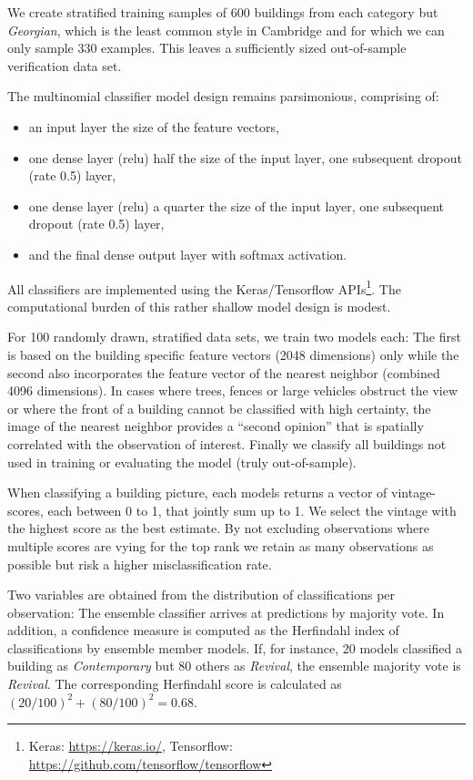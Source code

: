\documentclass[]{article}
\let\rmarkdownfootnote\footnote%
\def\footnote{\protect\rmarkdownfootnote}
\begin{document}
We create stratified training samples of 600 buildings from each
category but \emph{Georgian}, which is the least common style in
Cambridge and for which we can only sample 330 examples. This leaves a
sufficiently sized out-of-sample verification data set.

The multinomial classifier model design remains parsimonious, comprising
of:

\begin{itemize}
\item
  an input layer the size of the feature vectors,
\item
  one dense layer (relu) half the size of the input layer, one
  subsequent dropout (rate 0.5) layer,
\item
  one dense layer (relu) a quarter the size of the input layer, one
  subsequent dropout (rate 0.5) layer,
\item
  and the final dense output layer with softmax activation.
\end{itemize}

All classifiers are implemented using the Keras/Tensorflow
APIs\footnote{Keras: \href{https://keras.io/}{https://keras.io/}, Tensorflow: \href{https://github.com/tensorflow/tensorflow}{https://github.com/tensorflow/tensorflow}}.
The computational burden of this rather shallow model design is modest.

For 100 randomly drawn, stratified data sets, we train two models each:
The first is based on the building specific feature vectors (2048
dimensions) only while the second also incorporates the feature vector
of the nearest neighbor (combined 4096 dimensions). In cases where
trees, fences or large vehicles obstruct the view or where the front of
a building cannot be classified with high certainty, the image of the
nearest neighbor provides a ``second opinion'' that is spatially
correlated with the observation of interest. Finally we classify all
buildings not used in training or evaluating the model (truly
out-of-sample).

When classifying a building picture, each models returns a vector of
vintage-scores, each between 0 to 1, that jointly sum up to 1. We select
the vintage with the highest score as the best estimate. By not
excluding observations where multiple scores are vying for the top rank
we retain as many observations as possible but risk a higher
misclassification rate.

Two variables are obtained from the distribution of classifications per
observation: The ensemble classifier arrives at predictions by majority
vote. In addition, a confidence measure is computed as the Herfindahl
index of classifications by ensemble member models. If, for instance, 20
models classified a building as \emph{Contemporary} but 80 others as
\emph{Revival}, the ensemble majority vote is \emph{Revival}. The
corresponding Herfindahl score is calculated as
\((20/100)^2 + (80/100)^2 = 0.68\).
\end{document}
